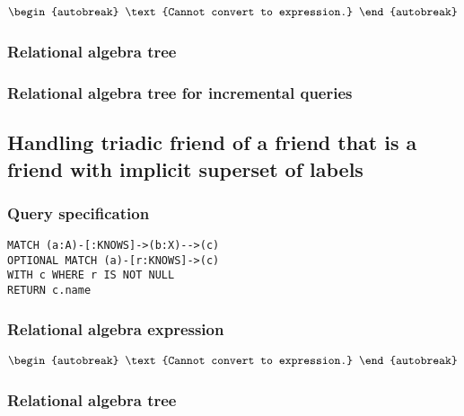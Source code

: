 \begin{align*}
\begin{autobreak}
\text{Cannot convert to expression.}
\end{autobreak}
\end{align*}

\subsubsection*{Relational algebra tree}


\subsubsection*{Relational algebra tree for incremental queries}


\subsection{Handling triadic friend of a friend that is a friend with implicit superset of labels}

\subsubsection*{Query specification}

\begin{lstlisting}
MATCH (a:A)-[:KNOWS]->(b:X)-->(c)
OPTIONAL MATCH (a)-[r:KNOWS]->(c)
WITH c WHERE r IS NOT NULL
RETURN c.name
\end{lstlisting}

\subsubsection*{Relational algebra expression}

\begin{align*}
\begin{autobreak}
\text{Cannot convert to expression.}
\end{autobreak}
\end{align*}

\subsubsection*{Relational algebra tree}

